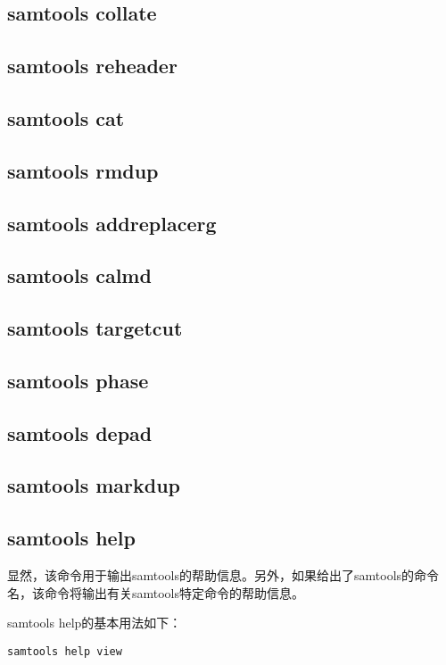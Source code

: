 \subsection{samtools collate}

\subsection{samtools reheader}

\subsection{samtools cat}

\subsection{samtools rmdup}

\subsection{samtools addreplacerg}

\subsection{samtools calmd}

\subsection{samtools targetcut}

\subsection{samtools phase}

\subsection{samtools depad}

\subsection{samtools markdup}

\subsection{samtools help}

显然，该命令用于输出samtools的帮助信息。另外，如果给出了samtools的命令名，该命令将输出有关samtools特定命令的帮助信息。

samtools help的基本用法如下：

\begin{lstlisting}[style=mycommandBlockStyle]
samtools help view
\end{lstlisting}


